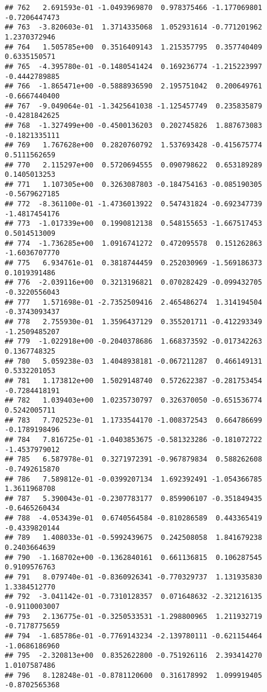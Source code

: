 \documentclass[
]{article}
\begin{document}
\begin{verbatim}
## 762   2.691593e-01 -1.0493969870  0.978375466 -1.177069801 -0.7206447473
## 763  -3.820603e-01  1.3714335068  1.052931614 -0.771201962  1.2370372946
## 764   1.505785e+00  0.3516409143  1.215357795  0.357740409  0.6335150571
## 765  -4.395780e-01 -0.1480541424  0.169236774 -1.215223997 -0.4442789885
## 766  -1.865471e+00 -0.5888936590  2.195751042  0.200649761 -0.6667440400
## 767  -9.049064e-01 -1.3425641038 -1.125457749  0.235835879 -0.4281842625
## 768  -1.327499e+00 -0.4500136203  0.202745826  1.887673083 -0.1821335111
## 769   1.767628e+00  0.2820760792  1.537693428 -0.415675774  0.5111562659
## 770   2.115297e+00  0.5720694555  0.090798622  0.653189289  0.1405013253
## 771   1.107305e+00  0.3263087803 -0.184754163 -0.085190305 -0.5679627185
## 772  -8.361100e-01 -1.4736013922  0.547431824 -0.692347739 -1.4817454176
## 773  -1.017339e+00  0.1990812138  0.548155653 -1.667517453  0.5014513009
## 774  -1.736285e+00  1.0916741272  0.472095578  0.151262863 -1.6036707770
## 775   6.934761e-01  0.3818744459  0.252030969 -1.569186373  0.1019391486
## 776  -2.039116e+00  0.3213196821  0.070282429 -0.099432705 -0.3220556043
## 777   1.571698e-01 -2.7352509416  2.465486274  1.314194504 -0.3743093437
## 778   2.755930e-01  1.3596437129  0.355201711 -0.412293349 -1.2509485207
## 779  -1.022918e+00 -0.2040378686  1.668373592 -0.017342263  0.1367748325
## 780   5.059238e-03  1.4048938181 -0.067211287  0.466149131  0.5332201053
## 781   1.173812e+00  1.5029148740  0.572622387 -0.281753454 -0.7284418191
## 782   1.039403e+00  1.0235730797  0.326370050 -0.651536774  0.5242005711
## 783   7.702523e-01  1.1733544170 -1.008372543  0.664786699 -0.1789198496
## 784   7.816725e-01 -1.0403853675 -0.581323286 -0.181072722 -1.4537979012
## 785   6.587978e-01  0.3271972391 -0.967879834  0.588262608 -0.7492615870
## 786   7.589812e-01 -0.0399207134  1.692392491 -1.054366785  1.3611968708
## 787   5.390043e-01 -0.2307783177  0.859906107 -0.351849435 -0.6465260434
## 788  -4.053439e-01  0.6740564584 -0.810286589  0.443365419 -0.4339820144
## 789   1.408033e-01 -0.5992439675  0.242508058  1.841679238  0.2403664639
## 790  -1.168702e+00 -0.1362840161  0.661136815  0.106287545  0.9109576763
## 791   8.079740e-01 -0.8360926341 -0.770329737  1.131935830  1.3384512770
## 792  -3.041142e-01 -0.7310128357  0.071648632 -2.321216135 -0.9110003007
## 793   2.136775e-01 -0.3250533531 -1.298800965  1.211932719 -0.7178775659
## 794  -1.685786e-01 -0.7769143234 -2.139780111 -0.621154464 -1.0686186960
## 795  -2.320813e+00  0.8352622800 -0.751926116  2.393414270  1.0107587486
## 796   8.128248e-01 -0.8781120600  0.316178992  1.099919405 -0.8702565368

\end{verbatim}
\end{document}
